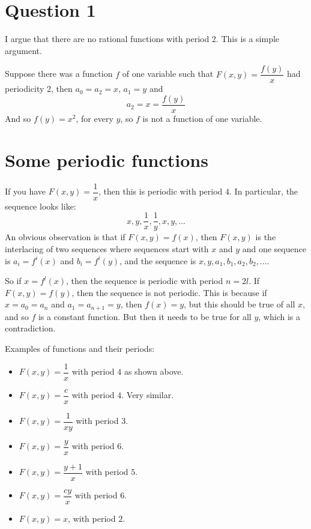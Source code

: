 \documentclass[12pt]{article}
\begin{document}
\maketitle

\section{Question 1}

I argue that there are no rational functions with period 2. This is a simple argument.

Suppose there was a function $f$ of one variable such that $F(x,y) = \dfrac{f(y)}{x}$ had periodicity 2, then $a_0 = a_2 = x$, $a_1 = y$ and
\[ a_2 = x = \dfrac{f(y)}{x} \]
And so $f(y) = x^2$, for every $y$, so $f$ is not a function of one variable. 

\section{Some periodic functions}

If you have $F(x,y) = \dfrac{1}{x}$, then this is periodic with period $4$. In particular, the sequence looks like:
\[ x, y, \dfrac{1}{x}, \dfrac{1}{y}, x, y, ... \]
An obvious observation is that if $F(x,y) = f(x)$, then $F(x,y)$ is the interlacing of two sequences where sequences start with $x$ and $y$ and one sequence is $a_i = f^{i}(x)$ and $b_i = f^{i}(y)$, and the sequence is $x,y,a_1, b_1, a_2, b_2, ...$.

So if $x = f^{l}(x)$, then the sequence is periodic with period $n = 2l$. If $F(x,y) = f(y)$, then the sequence is not periodic. This is because if $x = a_0 = a_n$ and $a_1 = a_{n+1} = y$, then $f(x) = y$, but this should be true of all $x$, and so $f$ is a constant function. But then it needs to be true for all $y$, which is a contradiction. 

Examples of functions and their periods:
\begin{itemize}
\item $F(x, y) = \dfrac{1}{x}$ with period $4$ as shown above.
\item $F(x,y) = \dfrac{c}{x}$ with period $4$. Very similar.
\item $F(x,y) = \dfrac{1}{xy}$ with period $3$.
\item $F(x,y) = \dfrac{y}{x}$ with period $6$.
\item $F(x,y) = \dfrac{y+1}{x}$ with period $5$.
\item $F(x,y) = \dfrac{cy}{x}$ with period $6$. 
\item $F(x,y) = x$, with period $2$. 
\end{itemize}
\end{document}
